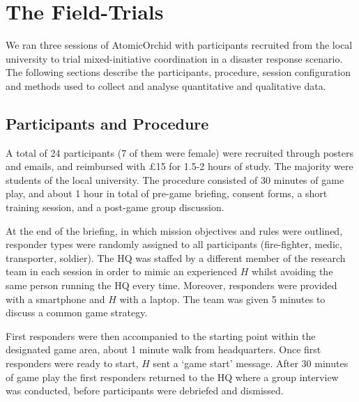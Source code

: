 \section{The Field-Trials}\label{sec:evaluation}
\noindent We ran three sessions of AtomicOrchid with participants recruited from the local university to trial mixed-initiative coordination in a disaster response scenario. The following sections describe the participants, procedure, session configuration and methods used to collect and analyse quantitative and qualitative data.

\subsection{Participants and Procedure}
\noindent  A total of 24 participants (7 of them were female) were recruited through posters and emails, and reimbursed with \pounds 15  for 1.5-2 hours of study. The majority were students of the local university. The procedure consisted of 30 minutes of game play, and about 1 hour in total of pre-game briefing, consent forms,  a short training session, and a post-game group discussion. 


At the end of the briefing, in which mission objectives and rules were outlined, responder types were randomly assigned to all participants (fire-fighter, medic, transporter, soldier). The HQ was staffed by a different member of the research team in each session in order to mimic an experienced $H$ whilst avoiding the same person running the HQ every time.  Moreover, responders were provided with a smartphone and $H$ with a laptop. The team was given 5 minutes to discuss a common game strategy. 


First responders were then accompanied to the starting point within the designated game area, about 1 minute walk from headquarters. Once first responders were ready to start, $H$ sent a `game start' message. After 30 minutes of game play the first responders returned to the HQ where a group interview was conducted, before participants were debriefed and dismissed.

